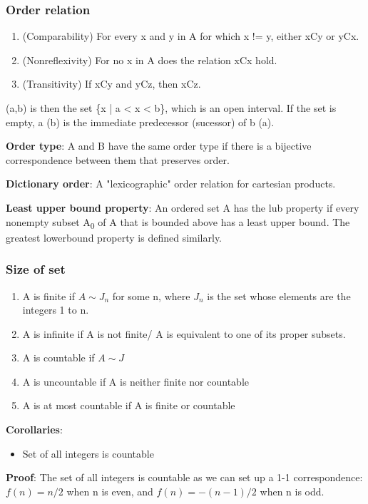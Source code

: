 \documentclass[11pt]{article}
\begin{document}
\subsubsection{Order relation}
\label{sec:orgca89779}

\begin{enumerate}
\item (Comparability) For every x and y in A for which x != y, either xCy or yCx.
\item (Nonreflexivity) For no x in A does the relation xCx hold.
\item (Transitivity) If xCy and yCz, then xCz.
\end{enumerate}


(a,b) is then the set \{x | a < x < b\}, which is an open interval. If the set is empty, a (b) is the immediate predecessor (sucessor) of b (a).

\textbf{Order type}: A and B have the same order type if there is a bijective correspondence between them that preserves order.

\textbf{Dictionary order}: A "lexicographic" order relation for cartesian products.

\textbf{Least upper bound property}: An ordered set A has the lub property if every nonempty subset A\textsubscript{0} of A that is bounded above has a least upper bound. The greatest lowerbound property is defined similarly.

\subsubsection{Size of set}
\label{sec:org260a0cb}

\begin{enumerate}
\item A is finite if \(A \sim J_n\) for some n, where \(J_n\) is the set whose elements are the integers 1 to n.
\item A is infinite if A is not finite/ A is equivalent to one of its proper subsets.
\item A is countable if \(A \sim J\)
\item A is uncountable if A is neither finite nor countable
\item A is at most countable if A is finite or countable
\end{enumerate}

\textbf{Corollaries}:

\begin{itemize}
\item Set of all integers is countable
\end{itemize}
\textbf{Proof}: The set of all integers is countable as we can set up a 1-1 correspondence: \(f(n) = n/2\) when n is even, and \(f(n) = - (n-1)/2\) when n is odd.
\end{document}
